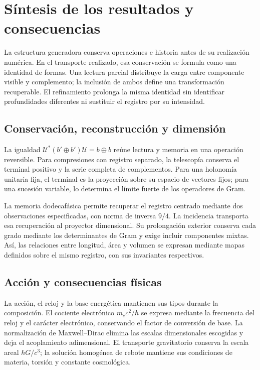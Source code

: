 \section{Síntesis de los resultados y consecuencias}
\label{nuclear:sintesis}
La estructura generadora conserva operaciones e historia antes de su realización numérica. En el transporte realizado, esa conservación se formula como una identidad de formas. Una lectura parcial distribuye la carga entre componente visible y complemento; la inclusión de ambos define una transformación recuperable. El refinamiento prolonga la misma identidad sin identificar profundidades diferentes ni sustituir el registro por su intensidad.

\subsection{Conservación, reconstrucción y dimensión}
La igualdad \(\mathcal U^*(b'\oplus b')\mathcal U=b\oplus b\) reúne lectura y memoria en una operación reversible. Para compresiones con registro separado, la telescopía conserva el terminal positivo y la serie completa de complementos. Para una holonomía unitaria fija, el terminal es la proyección sobre su espacio de vectores fijos; para una sucesión variable, lo determina el límite fuerte de los operadores de Gram.

La memoria dodecafásica permite recuperar el registro centrado mediante dos observaciones especificadas, con norma de inversa \(9/4\). La incidencia transporta esa recuperación al proyector dimensional. Su prolongación exterior conserva cada grado mediante los determinantes de Gram y exige incluir componentes mixtas. Así, las relaciones entre longitud, área y volumen se expresan mediante mapas definidos sobre el mismo registro, con sus invariantes respectivos.

\subsection{Acción y consecuencias físicas}
La acción, el reloj y la base energética mantienen sus tipos durante la composición. El cociente electrónico \(m_ec^2/\hbar\) se expresa mediante la frecuencia del reloj y el carácter electrónico, conservando el factor de conversión de base. La normalización de Maxwell--Dirac elimina las escalas dimensionales escogidas y deja el acoplamiento adimensional. El transporte gravitatorio conserva la escala areal \(\hbar G/c^3\); la solución homogénea de rebote mantiene sus condiciones de materia, torsión y constante cosmológica.

